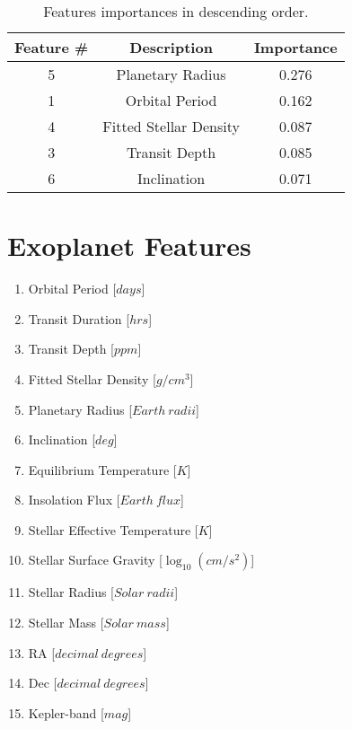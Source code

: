 \documentclass[11pt, a4paper]{article}
\begin{document}
  \begin{table}
    \centering
    \begin{tabular}{|c c c|}
    \hline
    Feature \# & Description & Importance \\
    \hline\hline
    5 & Planetary Radius & 0.276 \\
    1 & Orbital Period & 0.162 \\
    4 & Fitted Stellar Density & 0.087 \\
    3 & Transit Depth & 0.085 \\
    6 & Inclination & 0.071 \\
    \hline
    \end{tabular}
    \caption{Features importances in descending order.}
    \label{table:importances}
  \end{table}

\appendix
\appendixpage

\section{Exoplanet Features}
  \label{appendix:features}
  \begin{multicols}{2}
    \begin{enumerate}
      \item Orbital Period [$days$]
      \item Transit Duration [$hrs$]
      \item Transit Depth [$ppm$]
      \item Fitted Stellar Density [$g/cm^{3}$]
      \item Planetary Radius [$Earth\:radii$]
      \item Inclination [$deg$]
      \item Equilibrium Temperature [$K$]
      \item Insolation Flux [$Earth\:flux$]
      \item Stellar Effective Temperature [$K$]
      \item Stellar Surface Gravity [$\log_{10}(cm/s^{2})$]
      \item Stellar Radius [$Solar\:radii$]
      \item Stellar Mass [$Solar\:mass$]
      \item RA [$decimal\:degrees$]
      \item Dec [$decimal\:degrees$]
      \item Kepler-band [$mag$]
    \end{enumerate}
  \end{multicols}
\end{document}
